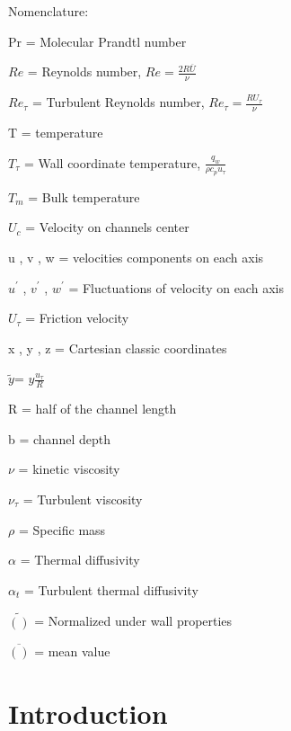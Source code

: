 \documentclass[10pt]{article} %
\begin{document}
\pagebreak

\begin{LARGE}
	Nomenclature: 
\end{LARGE} 


	Pr = Molecular Prandtl number
	
	
	
	
	$Re$ = Reynolds number, $Re = \frac{2R \overline{U}}{\nu}$
	
	
	$Re_\tau$ = Turbulent Reynolds number, $Re_\tau = \frac{R U_\tau}{\nu}$
	
	
	
	T = temperature
	
	
	
	$T_\tau$ = Wall coordinate temperature, $\frac{q_w}{\rho c_p u_\tau}$ 
	
	
	
	
	$T_m$ = Bulk temperature 
	
	
	
	
	${U}_c$ = Velocity on channels center
	
	
	
	u , v , w = velocities components on each axis
	
	
	$u^\prime $ , $ v^\prime $ , $ w^\prime $ = Fluctuations of velocity on each axis
	
	
	$U_\tau$ = Friction velocity
	
	
	x , y , z = Cartesian classic coordinates
	
	
	$\tilde{y} $= $ y \frac{u_\tau}{R} $
	
	
	R = half of the channel length
	
	
	
	b = channel depth
	
	
	
	$\nu$ = kinetic viscosity
	
	
	$\nu_\tau$ = Turbulent viscosity
	
	
	$\rho$ = Specific mass
	
	
	$\alpha$ = Thermal diffusivity
	
	
	$\alpha_t$ = Turbulent thermal diffusivity 
	
	
	$\tilde{()}$ = Normalized under wall properties
	
	$\overline{()}$ = mean value  



\tableofcontents

\section{Introduction}
\end{document}
